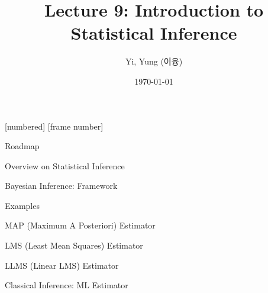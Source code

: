 

\csname\pdfmode\endcsname

{
  [numbered]
  [frame number]  %
}



\title[]{Lecture 9: Introduction to Statistical Inference}
\author{Yi, Yung (이융)}
\date{\today}









\begin{frame}
  \titlepage
\end{frame}





\begin{frame}{Roadmap}

\plitemsep 0.15in

\bce[(1)]

\item Overview on Statistical Inference

\item Bayesian Inference: Framework

\item Examples

\item MAP (Maximum A Posteriori) Estimator

\item LMS (Least Mean Squares) Estimator

\item LLMS (Linear LMS) Estimator

\item Classical Inference: ML Estimator



  
  \ece

\end{frame}


